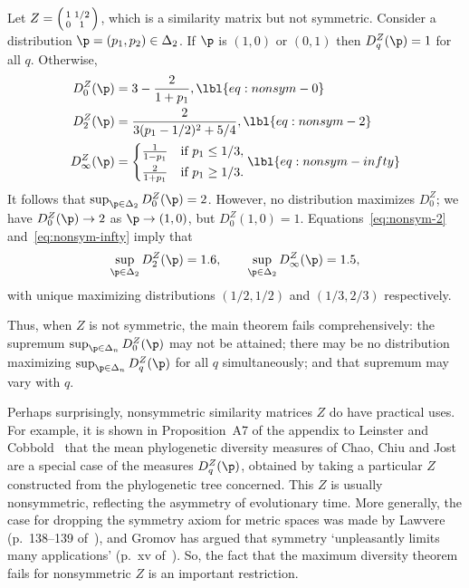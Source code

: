 \begin{example}
% 
Let $Z = \Bigl( \begin{smallmatrix} 1 & 1/2 \\ 0 & 1 \end{smallmatrix}
\Bigr)$, which is a similarity matrix but not symmetric.  Consider a
distribution $\p = (p_1, p_2) \in \Delta_2$.  If $\p$ is $(1, 0)$ or $(0,
1)$ then $D_q^Z(\p) = 1$ for all $q$.  Otherwise,
% 
\begin{align}
D_0^Z(\p)       &
=
3 - \frac{2}{1 + p_1},  
\lbl{eq:nonsym-0}
\\
D_2^Z(\p)       &
=
\frac{2}{3(p_1 - 1/2)^2 + 5/4}, 
\lbl{eq:nonsym-2}
\\
D_\infty^Z(\p)  &
=
\begin{cases}
\frac{1}{1 - p_1}       & 
\text{if } p_1 \leq 1/3,\\[.5ex]
\frac{2}{1 + p_1}       &
\text{if } p_1 \geq 1/3.
\end{cases}
\lbl{eq:nonsym-infty}
\end{align}
% 
It follows 
that $\sup_{\p \in \Delta_2} D_0^Z(\p) = 2$.  However, no distribution
maximizes $D_0^Z$; we have $D_0^Z(\p) \to 2$ as $\p \to (1, 0)$, but
$D_0^Z(1, 0) = 1$.  Equations~\eqref{eq:nonsym-2}
and~\eqref{eq:nonsym-infty} imply that
\[
\sup_{\p \in \Delta_2} D_2^Z(\p) = 1.6,
\qquad
\sup_{\p \in \Delta_2} D_\infty^Z(\p) = 1.5,
\]
with unique maximizing distributions $(1/2, 1/2)$ and $(1/3, 2/3)$
respectively.

Thus, when $Z$ is not symmetric, the main theorem fails comprehensively:
the supremum $\sup_{\p \in \Delta_n} D_0^Z(\p)$ may not be attained; there
may be no distribution maximizing $\sup_{\p \in \Delta_n} D_q^Z(\p)$ for
all $q$ simultaneously; and that supremum may vary with $q$.
\end{example}

Perhaps surprisingly, nonsymmetric similarity matrices $Z$ do have
practical uses.  For example, it is shown in Proposition~A7 of the appendix
to Leinster and Cobbold~\cite{MDISS} that the mean phylogenetic diversity
measures of Chao,%
%
%
Chiu and Jost~\cite{CCJ} are a special case of the measures $D_q^Z(\p)$,
obtained by taking a particular $Z$ constructed from the phylogenetic tree
concerned.  This $Z$ is usually nonsymmetric, reflecting the asymmetry of
evolutionary time.  More generally, the case for dropping the symmetry
axiom for metric%
%
% 
spaces was made by Lawvere%
%
% 
(p.~138--139 of~\cite{LawvMSG}), and Gromov%
%
%
has argued that symmetry `unpleasantly limits many applications' (p.~xv
of~\cite{GromMSR}).  So, the fact that the maximum diversity theorem fails
for nonsymmetric $Z$ is an important restriction.

